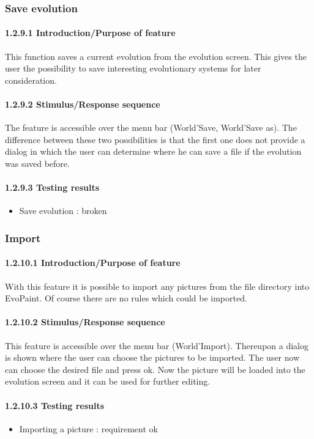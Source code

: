 \documentclass[titlepage,12pt]{scrartcl}
\begin{document}
\subsubsection{Save evolution}
\paragraph{1.2.9.1 Introduction/Purpose of feature}
This function saves a current evolution from the evolution screen. This gives the user the possibility to save interesting evolutionary systems for later consideration.
\paragraph{1.2.9.2 Stimulus/Response sequence}
The feature is accessible over the menu bar (World'Save, World'Save as). The difference between these two possibilities is that the first one does not provide a dialog in which the user can determine where he can save a file if the evolution was saved before.
\paragraph{1.2.9.3 Testing results}
\begin{itemize}
	\item Save evolution 	: broken
\end{itemize}

\subsubsection{Import}
\paragraph{1.2.10.1 Introduction/Purpose of feature}
With this feature it is possible to import any pictures from the file directory into EvoPaint. Of course there are no rules which could be imported. 
\paragraph{1.2.10.2 Stimulus/Response sequence}
This feature is accessible over the menu bar (World'Import). Thereupon a dialog is shown where the user can choose the pictures to be imported. The user now can choose the desired file and press ok. Now the picture will be loaded into the evolution screen and it can be used for further editing.
\paragraph{1.2.10.3 Testing results}
\begin{itemize}
	\item Importing a picture 	: requirement ok
\end{itemize}
\end{document}
